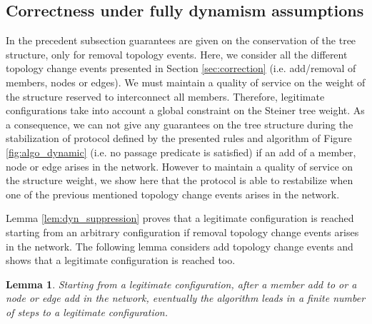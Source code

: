 \documentclass[11pt]{article}
\newtheorem{lemma}{Lemma}
\begin{document}
\subsection*{Correctness under fully dynamism  assumptions}

In the precedent subsection guarantees are given on the conservation of the tree structure, only for removal topology events. Here, we consider all the different topology change events presented in Section \ref{sec:correction} (i.e. add/removal of members, nodes or edges). We must maintain a quality of service on the weight of the structure reserved to interconnect all members. Therefore, legitimate configurations take into account a global constraint on the Steiner tree weight. As a consequence, we can not give any guarantees on the tree structure during the stabilization of protocol defined by the presented rules and algorithm of Figure \ref{fig:algo_dynamic} (i.e. no passage predicate is satisfied) if an add of a member, node or edge arises in the network. However to maintain a quality of service on the structure weight, we show here that the protocol is able to restabilize when one of the previous mentioned topology change events arises in the network.

Lemma \ref{lem:dyn_suppression} proves that a legitimate configuration is reached starting from an arbitrary configuration if removal topology change events arises in the network. The following lemma considers add topology change events and shows that a legitimate configuration is reached too.

\begin{lemma}
\label{lem:dyn_ajout}
Starting from a legitimate configuration, after a
member add to  or a node or edge add in the network, eventually the
algorithm leads in a finite number of steps to a legitimate
configuration.
\end{lemma}
\end{document}
